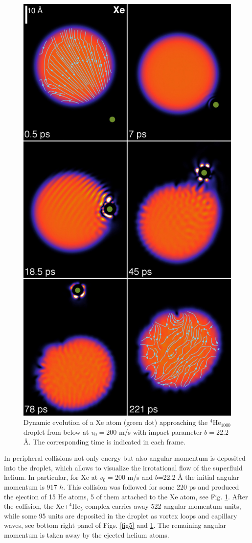 \begin{figure}[h]
\centerline{\includegraphics[width=0.60\linewidth,clip]{xehe200-b222-composed}}
\caption{\label{fig6} 
Dynamic evolution of a Xe atom (green dot) approaching the $^4$He$_{1000}$ 
droplet from below at $v_0 = 200$ m/s with impact parameter $b = 22.2$ \AA{}. The corresponding time is indicated in each frame.\cite{ESI}  
}
\end{figure}
%

In peripheral collisions not only energy but also angular momentum 
is deposited into the droplet, which allows  
to visualize the  irrotational flow of the superfluid helium.
In particular,
for Xe at $v_0=$200 m/s and $b$=22.2 \AA{} the initial angular momentum is 917 $\hbar$. 
This collision was followed for some 220 ps and
produced the ejection of 15 He atoms, 5 of them attached to the Xe atom, see Fig. \ref{fig6}. 
After the collision, the Xe+$^4$He$_5$ complex carries away 522 
angular momentum units, while some 95 units are deposited in the droplet as vortex loops and
capillary waves,\cite{Whi98} see bottom right panel of Figs. \ref{fig5} and \ref{fig6}. 
The remaining angular momentum is taken away by the ejected helium atoms.

